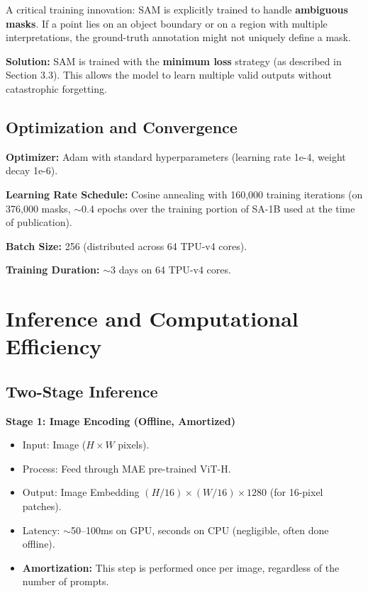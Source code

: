 A critical training innovation: SAM is explicitly trained to handle \textbf{ambiguous masks}. If a point lies on an object boundary or on a region with multiple interpretations, the ground-truth annotation might not uniquely define a mask.

\textbf{Solution:} SAM is trained with the \textbf{minimum loss} strategy (as described in Section 3.3). This allows the model to learn multiple valid outputs without catastrophic forgetting.

\subsection{Optimization and Convergence}

\textbf{Optimizer:} Adam with standard hyperparameters (learning rate 1e-4, weight decay 1e-6).

\textbf{Learning Rate Schedule:} Cosine annealing with 160,000 training iterations (on 376,000 masks, $\sim$0.4 epochs over the training portion of SA-1B used at the time of publication).

\textbf{Batch Size:} 256 (distributed across 64 TPU-v4 cores).

\textbf{Training Duration:} $\sim$3 days on 64 TPU-v4 cores.

\section{Inference and Computational Efficiency}

\subsection{Two-Stage Inference}

\textbf{Stage 1: Image Encoding (Offline, Amortized)}
\begin{itemize}
    \item Input: Image ($H \times W$ pixels).
    \item Process: Feed through MAE pre-trained ViT-H.
    \item Output: Image Embedding $(H/16) \times (W/16) \times 1280$ (for 16-pixel patches).
    \item Latency: $\sim$50–100ms on GPU, seconds on CPU (negligible, often done offline).
    \item \textbf{Amortization:} This step is performed once per image, regardless of the number of prompts.
\end{itemize}

